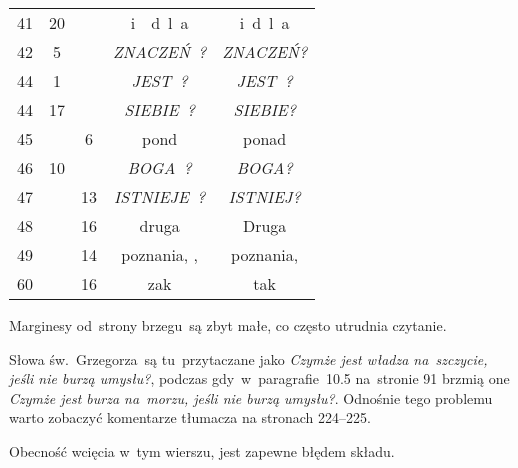 \documentclass[a4paper,11pt]{article}
\begin{document}
\begin{center}
\begin{tabular}{|c|c|c|c|c|}
    41  & 20 & & i~~d~l~a & i{}\, d~l~a \\
    42  &  5 & & \emph{ZNACZEŃ~?} & \emph{ZNACZEŃ?} \\
    44  &  1 & & \emph{JEST~?} & \emph{JEST~?} \\
    44  & 17 & & \emph{SIEBIE~?} & \emph{SIEBIE?} \\
    45  & &  6 & pond & ponad \\
    46  & 10 & & \emph{BOGA~?} & \emph{BOGA?} \\
    47  & & 13 & \emph{ISTNIEJE~?} & \emph{ISTNIEJ?} \\
    48  & & 16 & druga & Druga \\
    49  & & 14 & poznania,{ }, & poznania, \\
    60  & & 16 & zak & tak \\
    \hline
  \end{tabular}

\end{center}

\vspace{\spaceTwo}










\start Marginesy od~strony brzegu~są zbyt małe, co często utrudnia
czytanie.

\vspace{\spaceFour}


\start {} Słowa św.~Grzegorza~są tu~przytaczane jako
\emph{Czymże jest władza na~szczycie, jeśli nie burzą umysłu?},
podczas gdy~w~paragrafie~10.5 na~stronie 91 brzmią one \emph{Czymże
  jest burza na~morzu, jeśli nie burzą umysłu?}. Odnośnie tego
problemu warto zobaczyć komentarze tłumacza na stronach 224--225.

\vspace{\spaceFour}


\start {} Obecność wcięcia w~tym wierszu, jest zapewne
błędem składu.
\end{document}
